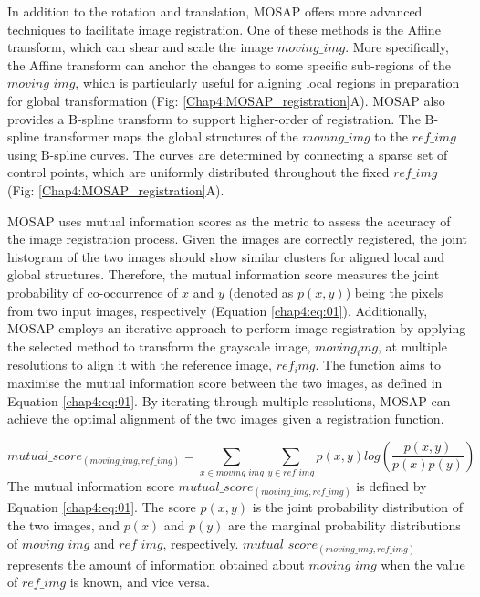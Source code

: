 In addition to the rotation and translation, MOSAP offers more advanced techniques to facilitate image registration. One of these methods is the Affine transform, which can shear and scale the image $moving\_img$. More specifically, the Affine transform can anchor the changes to some specific sub-regions of the $moving\_img$, which is particularly useful for aligning local regions in preparation for global transformation (Fig: \ref{Chap4:MOSAP_registration}A). MOSAP also provides a B-spline transform to support higher-order of registration. The B-spline transformer maps the global structures of the $moving\_img$ to the $ref\_img$ using B-spline curves. The curves are determined by connecting a sparse set of control points, which are uniformly distributed throughout the fixed $ref\_img$ \cite{shackelford2011deformable} (Fig: \ref{Chap4:MOSAP_registration}A). 

MOSAP uses mutual information scores as the metric to assess the accuracy of the image registration process. Given the images are correctly registered, the joint histogram of the two images should show similar clusters for aligned local and global structures. Therefore, the mutual information score measures the joint probability of co-occurrence of $x$ and $y$ (denoted as $p(x,y)$) being the pixels from two input images, respectively (Equation \ref{chap4:eq:01}). Additionally, MOSAP employs an iterative approach to perform image registration by applying the selected method to transform the grayscale image, $moving_img$, at multiple resolutions to align it with the reference image, $ref_img$. The function aims to maximise the mutual information score between the two images, as defined in Equation \ref{chap4:eq:01}. By iterating through multiple resolutions, MOSAP can achieve the optimal alignment of the two images given a registration function.

\begin{equation}
    mutual\_score_{(moving\_img, ref\_img)} = \sum_{x \in moving\_img} \sum_{y \in ref\_img} p(x,y)log(\frac{p(x,y)}{p(x)p(y)})
\label{chap4:eq:01}
\end{equation}
The mutual information score $mutual\_score_{(moving\_img, ref\_img)}$ is defined by Equation \ref{chap4:eq:01}. The score  $p(x,y)$ is the joint probability distribution of the two images, and $p(x)$ and $p(y)$ are the marginal probability distributions of $moving\_img$ and $ref\_img$, respectively. $mutual\_score_{(moving\_img, ref\_img)}$ represents the amount of information obtained about $moving\_img$ when the value of $ref\_img$ is known, and vice versa.  

